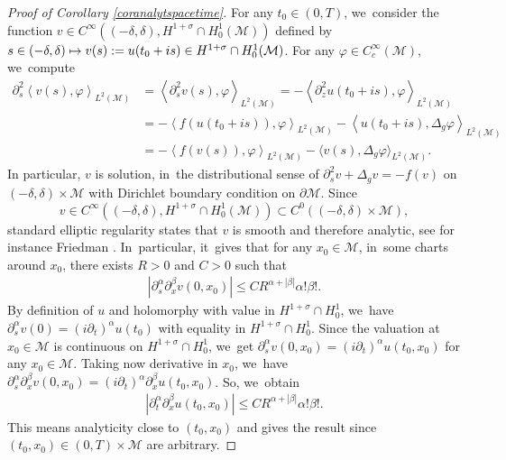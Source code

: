\documentclass[10pt]{amsart}
\newcommand\mto{\mathchoice{\longmapsto}{\mapsto}{\mapsto}{\mapsto}}
\theoremstyle{definition}
\let\mc\mathcal
\newcommand{\M}{\mc{M}}
\begin{document}
\begin{proof}[Proof of Corollary \ref{coranalytspacetime}]
For any $t_0\in (0,T)$, we~consider the function $v\in C^{\infty}((-\delta,\delta),H^{1+\sigma}\cap H^1_0(\M))$ defined by $s\in (-\delta,\delta)\mto v(s):=u(t_0+is)\in H^{1+\sigma}\cap H^1_0(\M)$. For any $\varphi\in C^{\infty}_c(\M)$, we~compute\vspace*{-3pt}
\begin{align*}
\partial_s^2 \left<v(s),\varphi\right>_{L^2(\M)}&=\left<\partial_s^2 v(s),\varphi\right>_{L^2(\M)}=-\left<\partial_z^2 u(t_0+is),\varphi\right>_{L^2(\M)}\\
&=-\left<f(u(t_0+is)),\varphi\right>_{L^2(\M)}-\left<u(t_0+is),\Delta_g \varphi\right>_{L^2(\M)}\\
&=-\left<f(v(s)),\varphi\right>_{L^2(\M)}-\langle v(s),\Delta_g \varphi\rangle_{L^2(\M)}.
\end{align*}
In particular, $v$ is solution, in~the distributional sense of $\partial_s^2v+\Delta_g v=-f(v)$ on $(-\delta,\delta)\times \M$ with Dirichlet boundary condition on $\partial \M$. Since
\[
v\in C^{\infty}((-\delta, \delta),H^{1+\sigma}\cap H^1_0(\M))\subset C^0((-\delta,\delta)\times \M),
\]
standard elliptic regularity states that $v$ is smooth and therefore analytic, see for instance Friedman \cite[Th.\,5]{Friedman:58}. In~particular, it~gives that for any $x_0\in \M$, in~some charts around $x_0$, there exists $R>0$ and $C>0$ such that
\begin{align*}
\left| \partial_s^{\alpha}\partial_x^{\beta}v(0,x_0)\right|\leq C R^{\alpha+|\beta|}\alpha!\beta!.
\end{align*}
By definition of $u$ and holomorphy with value in $H^{1+\sigma}\cap H^1_0$, we~have $\partial_s^{\alpha}v(0)=(i\partial_t)^{\alpha}u(t_0)$ with equality in $H^{1+\sigma}\cap H^1_0$. Since the valuation at $x_0\in \M$ is continuous on $H^{1+\sigma}\cap H^1_0$, we~get $\partial_s^{\alpha}v(0,x_0)=(i\partial_t)^{\alpha}u(t_0,x_0)$ for any $x_0\in \M$. Taking now derivative in $x_0$, we~have $\partial_s^{\alpha}\partial_x^{\beta}v(0,x_0)=(i\partial_t)^{\alpha}\partial_x^{\beta}u(t_0,x_0)$. So, we~obtain
\begin{align*}
\left| \partial_t^{\alpha}\partial_x^{\beta}u(t_0,x_0)\right|\leq C R^{\alpha+|\beta|}\alpha!\beta!.
\end{align*}
This means analyticity close to $(t_0,x_0)$ and gives the result since $(t_0,x_0)\in (0,T)\times \M$ are arbitrary.
\end{proof}
\end{document}
